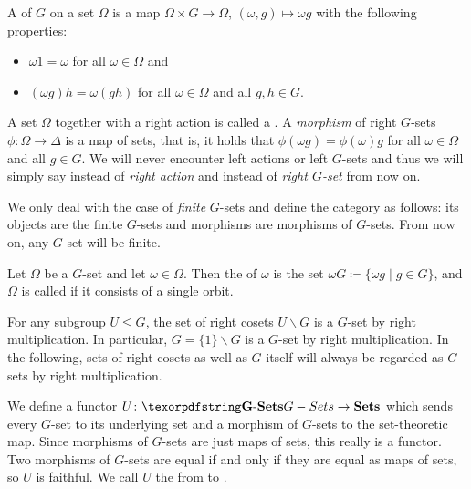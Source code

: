 \begin{defn}
A  of $G$ on a set $\Omega$ is a map $\Omega \times G \to \Omega$, $(\omega,g) \mapsto \omega g$ with the following properties:
\begin{itemize}
\item $\omega 1 = \omega$ for all $\omega \in \Omega$ and
\item $(\omega g) h = \omega (g h)$ for all $\omega \in \Omega$ and all $g,h \in G$.
\end{itemize}
A set $\Omega$ together with a right action is called a . A \emph{morphism} of right $G$-sets $\phi \colon \Omega \to \Delta$ is a  map of sets, that is, it holds that $\phi(\omega g) = \phi(\omega) g$ for all $\omega \in \Omega$ and all $g \in G$. We will never encounter left actions or left $G$-sets and thus we will simply say  instead of \emph{right action} and  instead of \emph{right $G$-set} from now on.

We only deal with the case of \emph{finite} $G$-sets and define the category \emphindex{\Gset{}} as follows: its objects are the finite $G$-sets and morphisms are morphisms of $G$-sets. From now on, any $G$-set will be finite.
\end{defn}

\begin{defn}[Orbits]
Let $\Omega$ be a $G$-set and let $\omega \in \Omega$. Then the  of $\omega$ is the set $\omega G \coloneqq \{\omega g \mid g \in G\}$, and $\Omega$ is called  if it consists of a single orbit.
\end{defn}

\begin{exmp}
For any subgroup $U \leq G$, the set of right cosets $U \backslash G$ is a $G$-set by right multiplication. In particular, $G = \{1\} \backslash G$ is a $G$-set by right multiplication. In the following, sets of right cosets as well as $G$ itself will always be regarded as $G$-sets by right multiplication.
\end{exmp}

\begin{defn}
We define a functor $U\colon \Gset \to \Set$ which sends every $G$-set to its underlying set and a morphism of $G$-sets to the set-theoretic map. Since morphisms of $G$-sets are just maps of sets, this really is a functor. Two morphisms of $G$-sets are equal if and only if they are equal as maps of sets, so $U$ is faithful. We call $U$ the  from \Gset{} to \Set{}.
\end{defn}

